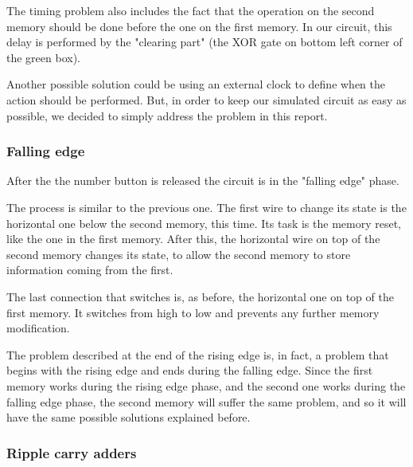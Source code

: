 \documentclass{article}
\begin{document}
\vspace{3mm}

The timing problem also includes the fact that the operation on the second memory should be done before the one on the first memory. In our circuit, this delay is performed by the "clearing part" (the XOR gate on bottom left corner of the green box). 

\vspace{3mm}

Another possible solution could be using an external clock to define when the action should be performed. But, in order to keep our simulated circuit as easy as possible, we decided to simply address the problem in this report.




\subsubsection{Falling edge}

After the the number button is released the circuit is in the "falling edge" phase.

\vspace{3mm}

The process is similar to the previous one. The first wire to change its state is the horizontal one below the second memory, this time. Its task is the memory reset, like the one in the first memory. After this, the horizontal wire on top of the second memory changes its state, to allow the second memory to store information coming from the first.

\vspace{3mm}

The last connection that switches is, as before, the horizontal one on top of the first memory. It switches from high to low and prevents any further memory modification.

\vspace{3mm}

The problem described at the end of the rising edge is, in fact, a problem that begins with the rising edge and ends during the falling edge. Since the first memory works during the rising edge phase, and the second one works during the falling edge phase, the second memory will suffer the same problem, and so it will have the same possible solutions explained before.


\subsubsection{Ripple carry adders}
\end{document}
